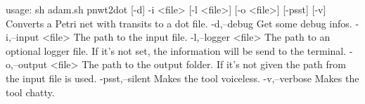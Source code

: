 usage: sh adam.sh pnwt2dot [-d] -i <file> [-l <file>] [-o <file>] [-psst]
       [-v]
Converts a Petri net with transits to a dot file.
 -d,--debug           Get some debug infos.
 -i,--input <file>    The path to the input file.
 -l,--logger <file>   The path to an optional logger file. If it's not
                      set, the information will be send to the terminal.
 -o,--output <file>   The path to the output folder. If it's not given the
                      path from the input file is used.
 -psst,--silent       Makes the tool voiceless.
 -v,--verbose         Makes the tool chatty.
